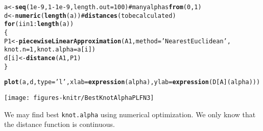 \documentclass[11pt]{article}\usepackage{graphicx, color}
\makeatletter
\newcommand{\hlfunctioncall}[1]{\textcolor[rgb]{0.501960784313725,0,0.329411764705882}{\textbf{#1}}}%
\newcommand{\hlstring}[1]{\textcolor[rgb]{0.6,0.6,1}{#1}}%
\newcommand{\hlcomment}[1]{\textcolor[rgb]{0.180392156862745,0.6,0.341176470588235}{#1}}%
\newenvironment{kframe}{%
 \def\at@end@of@kframe{}%
 \ifinner\ifhmode%
  \def\at@end@of@kframe{\end{minipage}}%
  \begin{minipage}{\columnwidth}%
 \fi\fi%
 \def\FrameCommand##1{\hskip\@totalleftmargin \hskip-\fboxsep
 \colorbox{shadecolor}{##1}\hskip-\fboxsep
     \hskip-\linewidth \hskip-\@totalleftmargin \hskip\columnwidth}%
 \MakeFramed {\advance\hsize-\width
   \@totalleftmargin\z@ \linewidth\hsize
   \@setminipage}}%
 {\par\unskip\endMakeFramed%
 \at@end@of@kframe}
\newenvironment{knitrout}{}{} %
\makeatother
\begin{document}
\begin{knitrout}\small
{}\color{fgcolor}\begin{kframe}
\begin{alltt}
a <- \hlfunctioncall{seq}(1e-9, 1-1e-9, length.out=100) \hlcomment{# many alphas \hlfunctioncall{from} (0,1)}
d <- \hlfunctioncall{numeric}(\hlfunctioncall{length}(a)) \hlcomment{# \hlfunctioncall{distances} (to be calculated)}
\hlfunctioncall{for} (i in 1:\hlfunctioncall{length}(a))
\{
   P1 <- \hlfunctioncall{piecewiseLinearApproximation}(A1, method=\hlstring{'NearestEuclidean'},
            knot.n=1, knot.alpha=a[i])
   d[i] <- \hlfunctioncall{distance}(A1, P1)
\}
\end{alltt}


{\ttfamily\noindent\color{warningcolor}{\#\# Warning: max(abs(d[K]))==7.14806e-08}}

{\ttfamily\noindent\color{warningcolor}{\#\# Warning: max(abs(d[K]))==1.19959e-07}}

{\ttfamily\noindent\color{warningcolor}{\#\# Warning: max(abs(d[K]))==3.57378e-07}}

{\ttfamily\noindent\color{warningcolor}{\#\# Warning: max(abs(d[K]))==1.19209e-07}}

{\ttfamily\noindent\color{warningcolor}{\#\# Warning: max(abs(d[K]))==2.38169e-07}}\begin{alltt}
\hlfunctioncall{plot}(a, d, type=\hlstring{'l'}, xlab=\hlfunctioncall{expression}(alpha), ylab=\hlfunctioncall{expression}(D[A](alpha)))
\end{alltt}
\end{kframe}
\end{knitrout}


\begin{center}
\begin{knitrout}\small
{}\color{fgcolor}

{\centering \texttt{[image: figures-knitr/BestKnotAlphaPLFN3]} 

}



\end{knitrout}

\end{center}

We may find best \texttt{knot.alpha} using numerical optimization.
We only know that the distance function is continuous.
\end{document}
